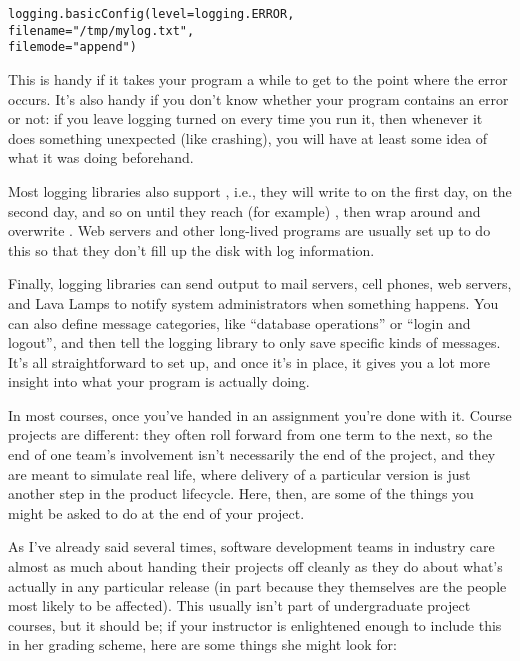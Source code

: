 \documentclass{report}
\begin{document}
\begin{alltt}
logging.basicConfig(level=logging.ERROR,
                    filename="/tmp/mylog.txt",
                    filemode="append")
\end{alltt}

This is handy if it takes your program a while to get to the point
where the error occurs.  It's also handy if you don't know whether
your program contains an error or not: if you leave logging turned on
every time you run it, then whenever it does something unexpected
(like crashing), you will have at least some idea of what it was doing
beforehand.

Most logging libraries also support , i.e.,
they will write to  on the first day,  on the
second day, and so on until they reach (for example) ,
then wrap around and overwrite .  Web servers and other
long-lived programs are usually set up to do this so that they don't
fill up the disk with log information.

Finally, logging libraries can send output to mail servers, cell
phones, web servers, and Lava Lamps to notify system administrators
when something  happens.  You can also define message
categories, like ``database operations'' or ``login and logout'', and
then tell the logging library to only save specific kinds of messages.
It's all straightforward to set up, and once it's in place, it gives
you a lot more insight into what your program is actually doing.


In most courses, once you've handed in an assignment you're done with
it.  Course projects are different: they often roll forward from one
term to the next, so the end of one team's involvement isn't
necessarily the end of the project, and they are meant to simulate
real life, where delivery of a particular version is just another step
in the product lifecycle.  Here, then, are some of the things you
might be asked to do at the end of your project.


As I've already said several times, software development teams in
industry care almost as much about handing their projects off cleanly
as they do about what's actually in any particular release (in part
because they themselves are the people most likely to be affected).
This usually isn't part of undergraduate project courses, but it
should be; if your instructor is enlightened enough to include this in
her grading scheme, here are some things she might look for:
\end{document}
